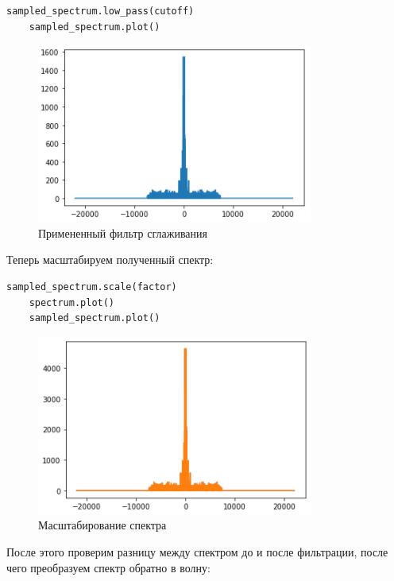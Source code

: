 \documentclass[a4paper]{article}
\begin{document}
\begin{lstlisting}[language=Python, caption= Применение фильтра сглаживания]
    sampled_spectrum.low_pass(cutoff)
    sampled_spectrum.plot()
\end{lstlisting}
            
            \begin{figure}[H]
                \centering
                \includegraphics{ex_3_7.png}
                \caption{Примененный фильтр сглаживания}
                \label{fig:ex_3_7}
            \end{figure}
            
            Теперь масштабируем полученный спектр:
            
\begin{lstlisting}[language=Python, caption= Масштабирование спектра]
    sampled_spectrum.scale(factor)
    spectrum.plot()
    sampled_spectrum.plot()
\end{lstlisting}
            
            \begin{figure}[H]
                \centering
                \includegraphics{ex_3_8.png}
                \caption{Масштабирование спектра}
                \label{fig:ex_3_8}
            \end{figure}
            
            После этого проверим разницу между спектром до и после фильтрации, после чего преобразуем спектр обратно в волну:
            
\end{document}

